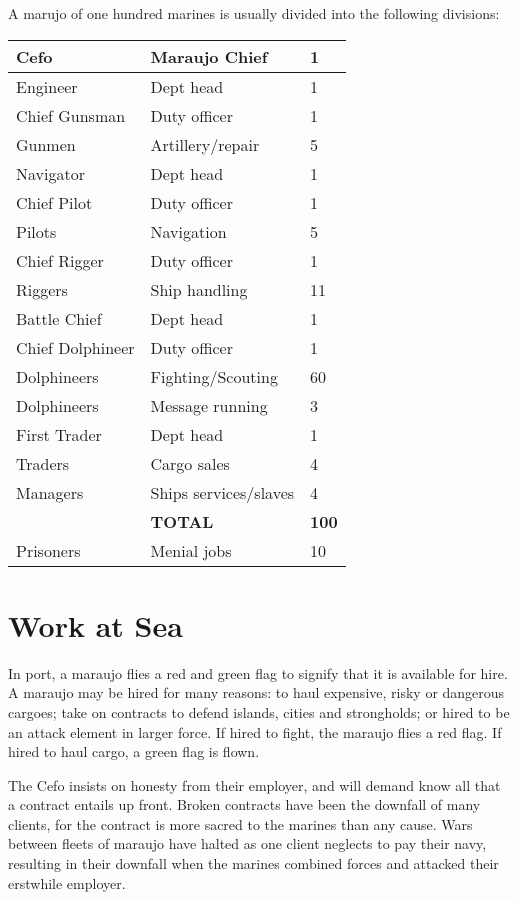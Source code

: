 A marujo of one hundred marines is usually divided into the following divisions:

\begin{normbox}
\small
\begin{tabular}{@{} l l l}
Cefo & Maraujo Chief & 1 \\
\midrule
Engineer & Dept head & 1\\
Chief Gunsman & Duty officer & 1\\
Gunmen & Artillery/repair & 5\\
\midrule
Navigator & Dept head & 1\\
Chief Pilot & Duty officer & 1\\
Pilots & Navigation & 5\\
Chief Rigger & Duty officer & 1\\
Riggers & Ship handling & 11\\
\midrule
Battle Chief & Dept head & 1\\
Chief Dolphineer & Duty officer & 1\\
Dolphineers & Fighting/Scouting & 60\\
Dolphineers & Message running & 3\\
\midrule
First Trader & Dept head & 1\\
Traders & Cargo sales & 4\\
Managers & Ships services/slaves & 4\\
\midrule
 & \bf{TOTAL} & \bf{100}\\
 \midrule
Prisoners & Menial jobs & 10\\
\end{tabular}
\end{normbox}

\section{Work at Sea}

In port, a maraujo flies a red and green flag to signify that it is available for hire. A maraujo may be hired
for many reasons: to haul expensive, risky or dangerous cargoes; take on contracts to defend islands, cities and strongholds; or hired to be an attack element in larger force. If hired to fight, the maraujo flies a red flag. If hired to haul cargo, a green flag is flown.

The Cefo insists on honesty from their employer, and will demand know all that a contract entails up front. Broken contracts have been the downfall of many clients, for the contract is more sacred to the marines than any cause. Wars between fleets of maraujo have halted as one client neglects to pay their navy, resulting in their downfall when the marines combined forces and attacked their erstwhile employer.


